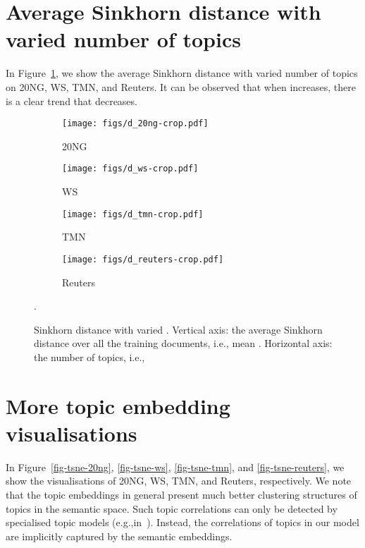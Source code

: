 \documentclass{article}
\begin{document}
\section{Average Sinkhorn distance with varied number of topics}
In Figure~\ref{fig-d}, we show the average Sinkhorn distance with varied number of topics on 20NG, WS, TMN, and Reuters. It can be observed that when  increases, there is a clear trend that  decreases.

\begin{figure}[t]
        \centering
         \begin{subfigure}[b]{0.23\linewidth}
                 \centering
                 \caption{20NG}
                 \texttt{[image: figs/d\_20ng-crop.pdf]}
         \end{subfigure}
          \hspace{0.0005\textwidth}
         \begin{subfigure}[b]{0.23\linewidth}
                 \centering
                 \caption{WS}
                 \texttt{[image: figs/d\_ws-crop.pdf]}
         \end{subfigure} 
         \hspace{0.0005\textwidth}
         \begin{subfigure}[b]{0.23\linewidth}
                 \centering
                 \caption{TMN}
                 \texttt{[image: figs/d\_tmn-crop.pdf]}
         \end{subfigure}\hspace{0.0005\textwidth}
         \begin{subfigure}[b]{0.23\linewidth}
                 \centering
                \caption{Reuters}
                 \texttt{[image: figs/d\_reuters-crop.pdf]}
         \end{subfigure}
\caption{Sinkhorn distance with varied . Vertical axis: the average Sinkhorn distance over all the training documents, i.e., mean . Horizontal axis: the number of topics, i.e., }.
\label{fig-d}
\end{figure}


\newpage
\section{More topic embedding visualisations}
\label{a-sec-more-vis}
In Figure~\ref{fig-tsne-20ng}, \ref{fig-tsne-ws}, \ref{fig-tsne-tmn}, and \ref{fig-tsne-reuters}, we show the visualisations of 20NG, WS, TMN, and Reuters, respectively. We note that the topic embeddings in general present much better clustering structures of topics in the semantic space. Such topic correlations can only be detected by specialised topic models (e.g.,in~\cite{lafferty2006correlated,blei2010nested,zhou2016augmentable}).
Instead, the correlations of topics in our model are implicitly captured by the semantic embeddings.
\end{document}

